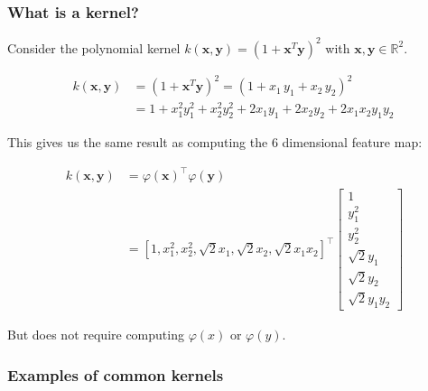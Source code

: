 \documentclass{beamer}
\begin{document}
    \begin{frame}
        \frametitle{What is a kernel?}
        Consider the polynomial kernel $k(\mathbf x, \mathbf y) = (1 + \mathbf x^T \mathbf y)^2$ with $\mathbf x, \mathbf y \in \mathbb R^2$.

        \begin{align}
            k(\mathbf x, \mathbf y) & = (1 + \mathbf x^T \mathbf y)^2 = (1 + x_1 \, y_1  + x_2 \, y_2)^2 \\
            & = 1 + x_1^2 y_1^2 + x_2^2 y_2^2 + 2 x_1 y_1 + 2 x_2 y_2 + 2 x_1 x_2 y_1 y_2 \
        \end{align}

        This gives us the same result as computing the 6 dimensional feature map:

        \begin{align}
            k(\mathbf x, \mathbf y) &= \varphi(\mathbf x)^\intercal \varphi(\mathbf y) \\
            &=[1, x_1^2, x_2^2, \sqrt{2} x_1, \sqrt{2} x_2, \sqrt{2} x_1 x_2]^\intercal\begin{bmatrix}1\\ y_1^2\\ y_2^2\\ \sqrt{2} y_1\\ \sqrt{2} y_2\\ \sqrt{2} y_1 y_2\end{bmatrix}
        \end{align}

        But does not require computing $\varphi(x)$ or $\varphi(y)$.
    \end{frame}

    \begin{frame}
        \frametitle{Examples of common kernels}
    \end{frame}
\end{document}
